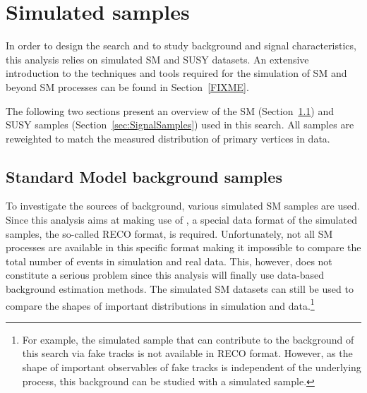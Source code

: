 \FloatBarrier
\chapter{Simulated samples}
\label{sec:SimulatedSamples}

In order to design the search and to study background and signal characteristics, this analysis relies on simulated  SM and SUSY datasets.
An extensive introduction to the techniques and tools required for the simulation of SM and beyond SM processes can be found in Section~\ref{FIXME}.

The following two sections present an overview of the SM (Section~\ref{sec:SMSamples}) and SUSY samples (Section~\ref{sec:SignalSamples}) used in this search.
All samples are reweighted to match the measured distribution of primary vertices in data.

\section{Standard Model background samples}
\label{sec:SMSamples}
To investigate the sources of background, various simulated SM samples are used.
Since this analysis aims at making use of \dedx, a special data format of the simulated samples, the so-called RECO format, is required.
Unfortunately, not all SM processes are available in this specific format making it impossible to compare the total number of events in simulation and real data.
This, however, does not constitute a serious problem since this analysis will finally use data-based background estimation methods.
The simulated SM datasets can still be used to compare the shapes of important distributions in simulation and data.\footnote{For example, the simulated \ZInvJets sample that can contribute to the background of this search via fake tracks is not available in RECO format. However, as the shape of important observables of fake tracks is independent of the underlying process, this background can be studied with a simulated \WJets sample.}

